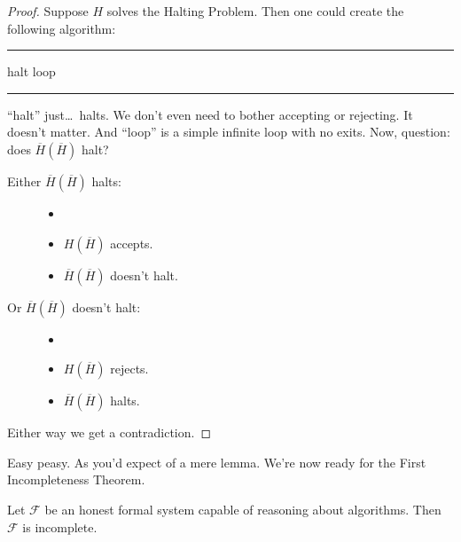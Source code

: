 \documentclass{article}
\theoremstyle{customstyle}
\newcommand{\F}{\ensuremath{\mathcal{F}}}
\newenvironment{algo}{\begin{samepage}\medskip\hrule\begin{algorithmic}}{\end{algorithmic}\hrule\medskip\end{samepage}}
\begin{document}
\begin{proof}
Suppose $H$ solves the Halting Problem. Then one could create the following algorithm:
\begin{algo}
    \State halt
  \EndIf
    \State loop
  \EndIf
\EndFunction
\end{algo}
``halt'' just\dots\ halts. We don't even need to bother accepting or rejecting. It doesn't matter. And ``loop'' is a simple infinite loop with no exits. Now, question: does $\overline{H}(\overline{H})$ halt?
\newline
\begin{minipage}{0.5\textwidth}
\smallskip
\begin{description}
\item[Either $\overline{H}(\overline{H})$ halts:]
\begin{itemize}[noitemsep]
\item[]
\item $H(\overline{H})$ accepts.
\item $\overline{H}(\overline{H})$ doesn't halt. \lightning
\end{itemize}
\end{description}
\smallskip
\end{minipage}
\begin{minipage}{0.45\textwidth}
\smallskip
\begin{description}
\item[Or $\overline{H}(\overline{H})$ doesn't halt:]
\begin{itemize}[noitemsep]
\item[]
\item $H(\overline{H})$ rejects.
\item $\overline{H}(\overline{H})$ halts. \lightning
\end{itemize}
\end{description}
\smallskip
\end{minipage}
\newline
Either way we get a contradiction.
\end{proof}

Easy peasy. As you'd expect of a mere lemma. We're now ready for the First Incompleteness Theorem.

\begin{theorem}
\label{original-first-by-computation}
Let $\F$ be an honest formal system capable of reasoning about algorithms. Then $\F$ is incomplete.
\end{theorem}
\end{document}
